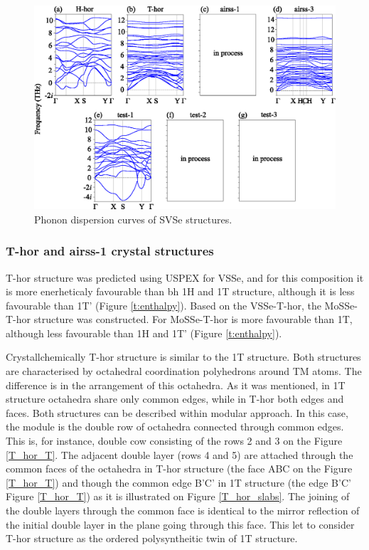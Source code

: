 \documentclass[a4paperm]{article}
\begin{document}
\begin{figure}[H]
	\includegraphics[width=\textwidth]{phon_svse.eps}
	\caption{Phonon dispersion curves of SVSe structures. }
	\label{phon_svse}
\end{figure}

\subsubsection{T-hor and airss-1 crystal structures}
T-hor structure was predicted using USPEX for VSSe, and for this composition it is more  enerheticaly favourable than bh 1H and 1T structure, although it is less favourable than 1T' (Figure \ref{t:enthalpy}).
Based on the VSSe-T-hor, the MoSSe-T-hor structure was constructed.
For MoSSe-T-hor is more favourable than 1T, although less favourable than 1H and 1T' (Figure \ref{t:enthalpy}).

Crystallchemically T-hor structure is similar to the 1T structure.
Both structures are characterised by octahedral coordination polyhedrons around TM atoms.
The difference is in the arrangement of this octahedra.
As it was mentioned, in 1T structure octahedra share only common edges, while in T-hor both edges and faces.
Both structures can be described within modular approach.
In this case, the module is the double row of octahedra connected through common edges.
This is, for instance, double cow consisting of the rows 2 and 3 on the Figure \ref{T_hor_T}.
The adjacent double layer (rows 4 and 5) are attached through the common faces  of the octahedra in T-hor structure (the face ABC on the Figure \ref{T_hor_T}) and though the common edge B'C' in 1T structure (the edge B'C' Figure \ref{T_hor_T}) as it is illustrated on Figure \ref{T_hor_slabs}.
The joining of the double layers through the common face is identical to the mirror reflection of the initial double layer in the plane going through this face.
This let to consider T-hor structure as the ordered polysyntheitic twin of 1T structure.
\end{document}
